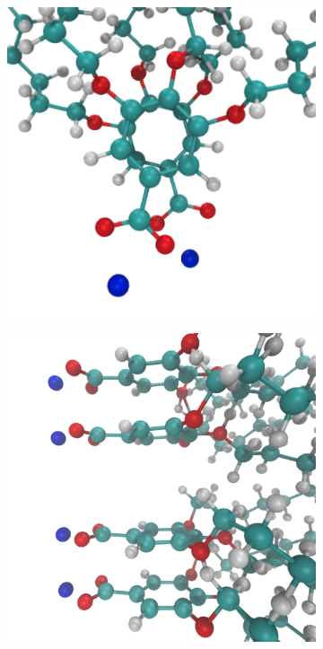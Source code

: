 \documentclass[journal=jpcbfk,manuscript=article]{achemso}
\begin{document}
  \begin{figure}[!htb]
  \centering
  \begin{subfigure}{0.325\linewidth}
  	\centering
  	\includegraphics[width=\textwidth]{rotated_monomers.pdf}
  	\label{fig:rotated_monomers}
  \end{subfigure}
  \begin{subfigure}{0.325\linewidth}
  	\centering
  	\includegraphics[width=\textwidth]{staggered.pdf}

\end{subfigure}
\end{figure}
\end{document}
